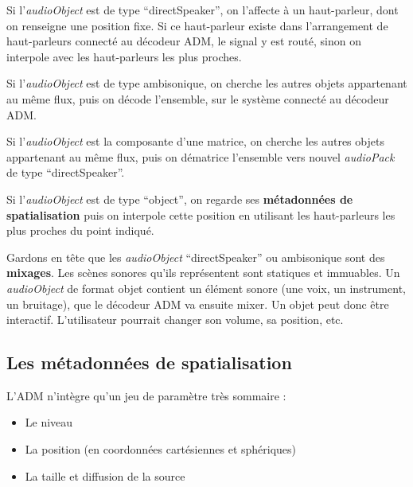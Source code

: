 \documentclass[
  letterpaper,
  DIV=11,
  numbers=noendperiod]{scrreprt}
\providecommand{\tightlist}{%
  \setlength{\itemsep}{0pt}\setlength{\parskip}{0pt}}\usepackage{longtable,booktabs,array}
\begin{document}
Si l'\emph{audioObject} est de type ``directSpeaker'', on l'affecte à un
haut-parleur, dont on renseigne une position fixe. Si ce haut-parleur
existe dans l'arrangement de haut-parleurs connecté au décodeur ADM, le
signal y est routé, sinon on interpole avec les haut-parleurs les plus
proches.

Si l'\emph{audioObject} est de type ambisonique, on cherche les autres
objets appartenant au même flux, puis on décode l'ensemble, sur le
système connecté au décodeur ADM.

Si l'\emph{audioObject} est la composante d'une matrice, on cherche les
autres objets appartenant au même flux, puis on dématrice l'ensemble
vers nouvel \emph{audioPack} de type ``directSpeaker''.

Si l'\emph{audioObject} est de type ``object'', on regarde ses
\textbf{métadonnées de spatialisation} puis on interpole cette position
en utilisant les haut-parleurs les plus proches du point indiqué.

\begin{tcolorbox}[enhanced jigsaw, leftrule=.75mm, arc=.35mm, bottomtitle=1mm, colback=white, colbacktitle=quarto-callout-tip-color!10!white, opacityback=0, left=2mm, rightrule=.15mm, opacitybacktitle=0.6, breakable, toptitle=1mm, titlerule=0mm, bottomrule=.15mm, toprule=.15mm, coltitle=black, title=\textcolor{quarto-callout-tip-color}{\faLightbulb}\hspace{0.5em}{Astuce}]

Gardons en tête que les \emph{audioObject} ``directSpeaker'' ou
ambisonique sont des \textbf{mixages}. Les scènes sonores qu'ils
représentent sont statiques et immuables. Un \emph{audioObject} de
format objet contient un élément sonore (une voix, un instrument, un
bruitage), que le décodeur ADM va ensuite mixer. Un objet peut donc être
interactif. L'utilisateur pourrait changer son volume, sa position, etc.

\end{tcolorbox}

\hypertarget{les-muxe9tadonnuxe9es-de-spatialisation}{%
\subsection{Les métadonnées de
spatialisation}\label{les-muxe9tadonnuxe9es-de-spatialisation}}

L'ADM n'intègre qu'un jeu de paramètre très sommaire :

\begin{itemize}
\tightlist
\item
  Le niveau
\item
  La position (en coordonnées cartésiennes et sphériques)
\item
  La taille et diffusion de la source
\end{itemize}
\end{document}
